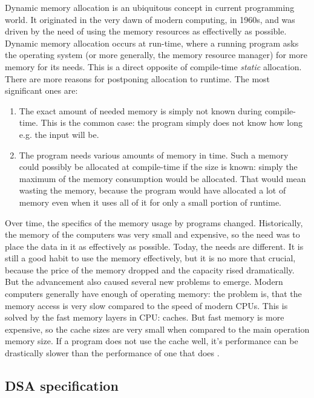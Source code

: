 Dynamic memory allocation is an ubiquitous concept in current programming world. It originated in the very dawn of modern computing, in 1960s, and was driven by the need of using the memory resources as effectivelly as possible. Dynamic memory allocation occurs at run-time, where a running program asks the operating system (or more generally, the memory resource manager) for more memory for its needs. This is a direct opposite of compile-time {\em static} allocation. There are more reasons for postponing allocation to runtime. The most significant ones are:
\begin{enumerate}
\item The exact amount of needed memory is simply not known during compile-time. This is the common case: the program simply does not know how long e.g. the input will be.
\item The program needs various amounts of memory in time. Such a memory could possibly be allocated at compile-time if the size is known: simply the maximum of the memory consumption would be allocated. That would mean wasting the memory, because the program would have allocated a lot of memory even when it uses all of it for only a small portion of runtime.
\end{enumerate}

Over time, the specifics of the memory usage by programs changed. Historically, the memory of the computers was very small and expensive, so the need was to place the data in it as effectively as possible. Today, the needs are different. It is still a good habit to use the memory effectively, but it is no more that crucial, because the price of the memory dropped and the capacity rised dramatically. But the advancement also caused several new problems to emerge. Modern computers generally have enough of operating memory: the problem is, that the memory access is very slow compared to the speed of modern CPUs. This is solved by the fast memory layers in CPU: caches. But fast memory is more expensive, so the cache sizes are very small when compared to the main operation memory size. If a program does not use the cache well, it's performance can be drastically slower than the performance of one that does \cite{drepper-memory}.     

\subsection{DSA specification}

